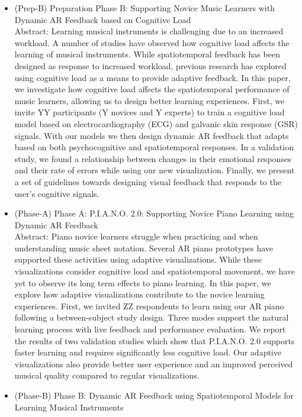 \documentclass[manuscript,screen]{acmart}
\begin{document}
\begin{itemize}
    \item (Prep-B) Preparation Phase B: Supporting Novice Music Learners with Dynamic AR Feedback based on Cognitive Load\\
    Abstract: Learning musical instruments is challenging due to an increased workload. A number of studies have observed how cognitive load affects the learning of musical instruments. While spatiotemporal feedback has been designed as response to increased workload, previous research has explored using cognitive load as a means to provide adaptive feedback. In this paper, we investigate how cognitive load affects the spatiotemporal performance of music learners, allowing us to design better learning experiences. First, we invite YY participants (Y novices and Y experts) to train a cognitive load model based on electrocardiography (ECG) and galvanic skin response (GSR) signals. With our models we then design dynamic AR feedback that adapts based on both psychocognitive and spatiotemporal responses. In a validation study,  we found a relationship between changes in their emotional responses and their rate of errors while using our new visualization. Finally, we present a set of guidelines towards designing visual feedback that responds to the user’s cognitive signals.
    \item (Phase-A) Phase A: P.I.A.N.O. 2.0: Supporting Novice Piano Learning using Dynamic AR Feedback\\
    Abstract: Piano novice learners struggle when practicing and when understanding music sheet notation. Several AR piano prototypes have supported these activities using adaptive visualizations. While these visualizations consider cognitive load and spatiotemporal movement, we have yet to observe its long term effects to piano learning. In this paper, we explore how adaptive visualizations contribute to the novice learning experiences. First, we invited ZZ respondents to learn using our AR piano following a between-subject study design. Three modes support the natural learning process with live feedback and performance evaluation. We report the results of two validation studies which show that P.I.A.N.O. 2.0 supports faster learning and requires significantly less cognitive load. Our adaptive visualizations also provide better user experience and an improved perceived musical quality compared to regular visualizations. 
    \item (Phase-B) Phase B: Dynamic AR Feedback using Spatiotemporal Models for Learning Musical Instruments\\

\end{itemize}
\end{document}
